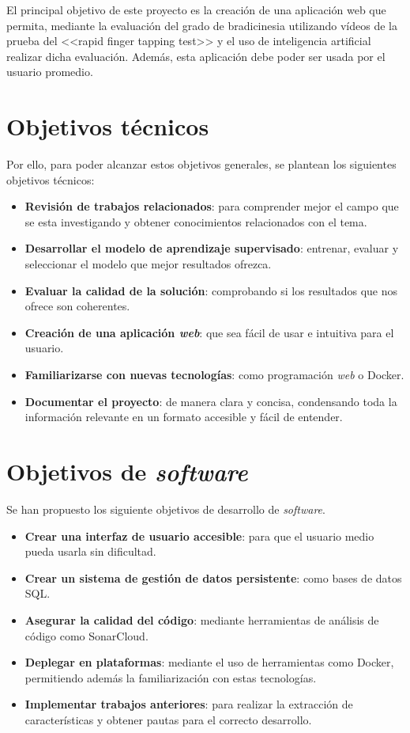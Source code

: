 
El principal objetivo de este proyecto es la creación de una aplicación web que permita, mediante la evaluación del grado de bradicinesia utilizando vídeos de la prueba del <<rapid finger tapping test>> y el uso de inteligencia artificial realizar dicha evaluación. Además, esta aplicación debe poder ser usada por el usuario promedio.


\section{Objetivos técnicos}

Por ello, para poder alcanzar estos objetivos generales, se plantean los siguientes objetivos técnicos:
\begin{itemize}
\item \textbf{Revisión de trabajos relacionados}: para comprender mejor el campo que se esta investigando y obtener conocimientos relacionados con el tema.
\item \textbf{Desarrollar el modelo de aprendizaje supervisado}: entrenar, evaluar y seleccionar el modelo que mejor resultados ofrezca.
\item \textbf{Evaluar la calidad de la solución}: comprobando si los resultados que nos ofrece son coherentes.
\item \textbf{Creación de una aplicación \textit{web}}: que sea fácil de usar e intuitiva para el usuario.
\item \textbf{Familiarizarse con nuevas tecnologías}: como programación \textit{web} o Docker.
\item \textbf{Documentar el proyecto}: de manera clara y concisa, condensando toda la información relevante en un formato accesible y fácil de entender.
\end{itemize}

\section{Objetivos de \textit{software}}

Se han propuesto los siguiente objetivos de desarrollo de \textit{software}.
\begin{itemize}
\item \textbf{Crear una interfaz de usuario accesible}: para que el usuario medio pueda usarla sin dificultad.
\item \textbf{Crear un sistema de gestión de datos persistente}: como bases de datos SQL.
\item \textbf{Asegurar la calidad del código}: mediante herramientas de análisis de código como SonarCloud.
\item \textbf{Deplegar en plataformas}: mediante el uso de herramientas como Docker, permitiendo además la familiarización con estas tecnologías.
\item \textbf{Implementar trabajos anteriores}: para realizar la extracción de características y obtener pautas para el correcto desarrollo.
\end{itemize}
